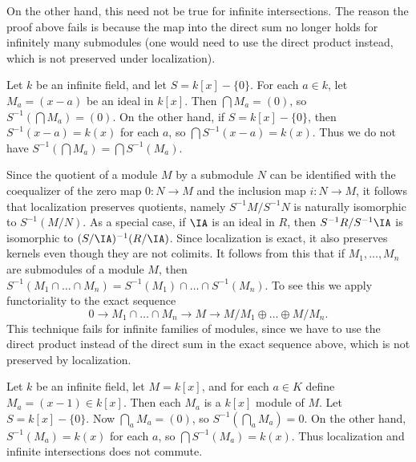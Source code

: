 On the other hand, this need not be true for infinite intersections. The reason the proof above fails is because the map into the direct sum no longer holds for infinitely many submodules (one would need to use the direct product instead, which is not preserved under localization).

\begin{example}
    Let $k$ be an infinite field, and let $S = k[x] - \{ 0 \}$. For each $a \in k$, let $M_a = (x - a)$ be an ideal in $k[x]$. Then $\bigcap M_a = (0)$, so $S^{-1}(\bigcap M_a) = (0)$. On the other hand, if $S = k[x] - \{ 0 \}$, then $S^{-1}(x-a) = k(x)$ for each $a$, so $\bigcap S^{-1}(x-a) = k(x)$. Thus we do not have $S^{-1}(\bigcap M_a) = \bigcap S^{-1}(M_a)$.
\end{example}

Since the quotient of a module $M$ by a submodule $N$ can be identified with the coequalizer of the zero map $0: N \to M$ and the inclusion map $i: N \to M$, it follows that localization preserves quotients, namely $S^{-1}M / S^{-1}N$ is naturally isomorphic to $S^{-1}(M/N)$. As a special case, if $\IA$ is an ideal in $R$, then $S^{-1}R / S^{-1} \IA$ is isomorphic to $(S/\IA)^{-1}(R/\IA)$. Since localization is exact, it also preserves kernels even though they are not colimits. It follows from this that if $M_1, \dots, M_n$ are submodules of a module $M$, then $S^{-1}(M_1 \cap \dots \cap M_n) = S^{-1}(M_1) \cap \dots \cap S^{-1}(M_n)$. To see this we apply functoriality to the exact sequence
%
\[ 0 \to M_1 \cap \dots \cap M_n \to M \to M/M_1 \oplus \dots \oplus M/M_n. \]
%
This technique fails for infinite families of modules, since we have to use the direct product instead of the direct sum in the exact sequence above, which is not preserved by localization.

\begin{example}
    Let $k$ be an infinite field, let $M = k[x]$, and for each $a \in K$ define $M_a = (x - 1) \in k[x]$. Then each $M_a$ is a $k[x]$ module of $M$. Let $S = k[x] - \{ 0 \}$. Now $\bigcap_a M_a = (0)$, so $S^{-1}(\bigcap_a M_a) = 0$. On the other hand, $S^{-1}(M_a) = k(x)$ for each $a$, so $\bigcap S^{-1}(M_a) = k(x)$. Thus localization and infinite intersections does not commute.
\end{example}

